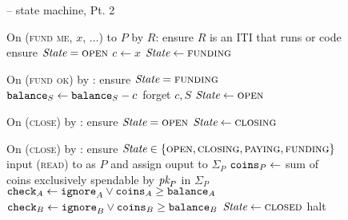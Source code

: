 \begin{figure}[H]
  \begin{systembox}{\fchan{} -- state machine, Pt. 2}
    \begin{algorithmic}[1]
      \State On (\textsc{fund me}, $x$, $\dots$) to $P$ by $R$:
      \Indent
        \State ensure $R$ is an ITI that runs \fchan or \pchan code
        \State ensure $\itistate = \textsc{open}$
        \State $c \gets x$
        \State $\itistate \gets \textsc{funding}$
      \EndIndent
      \Statex

      \State On (\textsc{fund ok}) by \adversary:
      \Indent
        \State ensure $\itistate = \textsc{funding}$
        \State $\texttt{balance}_{S} \gets \texttt{balance}_{S} - c$
        \State forget $c, S$
        \State $\itistate \gets \textsc{open}$
      \EndIndent
      \Statex

      \State On (\textsc{close}) by \environment:
      \Indent
        \State ensure $\itistate = \textsc{open}$
        \State $\itistate \gets \textsc{closing}$
      \EndIndent
      \Statex

      \State On (\textsc{close}) by \adversary:
      \Indent
        \State ensure $\itistate \in \{\textsc{open}, \textsc{closing},
        \textsc{paying}, \textsc{funding}\}$
        \label{code:functionality:state-machine-2:close:ensure}
            \State input (\textsc{read}) to \ledger as $P$ and assign ouput to
            $\Sigma_P$
            \State $\texttt{coins}_{P} \gets$ sum of coins exclusively spendable by
            $\textit{pk}_{P}$ in $\Sigma_P$
            \label{code:functionality:state-machine-2:close:coins}
          \EndIf
        \EndFor
        \State $\texttt{check}_A \gets \texttt{ignore}_A \vee \texttt{coins}_{A} \geq
        \texttt{balance}_{A}$
        \State $\texttt{check}_B \gets \texttt{ignore}_B \vee \texttt{coins}_{B} \geq
        \texttt{balance}_{B}$
          \State $\itistate \gets \textsc{closed}$
        \Else \: 
          \State halt
          \label{code:functionality:state-machine-2:halt}
        \EndIf
      \EndIndent
    \end{algorithmic}
  \end{systembox}
  \caption{}
  \label{code:functionality:state-machine-2}
\end{figure}
